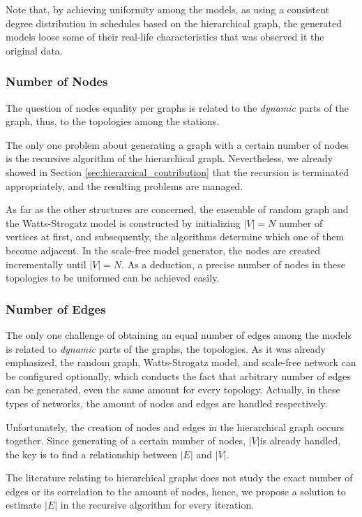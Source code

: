 Note that, by achieving uniformity among the models, as using a consistent degree distribution in schedules based on the hierarchical graph, the generated models loose some of their real-life characteristics that was observed it the original data.

\subsubsection{Number of Nodes}

The question of nodes equality per graphs is related to the \textit{dynamic} parts of the graph, thus, to the topologies among the stations.

The only one problem about generating a graph with a certain number of nodes is the recursive algorithm of the hierarchical graph. Nevertheless, we already showed in Section \ref{sec:hierarcical_contribution} that the recursion is terminated appropriately, and the resulting problems are managed.

As far as the other structures are concerned, the ensemble of random graph and the Watts-Strogatz model is constructed by initializing $|V| = N$ number of vertices at first, and subsequently, the algorithms determine which one of them become adjacent. In the scale-free model generator, the nodes are created incrementally until $|V| = N$. As a deduction, a precise number of nodes in these topologies to be uniformed can be achieved easily.

\subsubsection{Number of Edges}

The only one challenge of obtaining an equal number of edges among the models is related to \textit{dynamic} parts of the graphs, the topologies. As it was already emphasized, the random graph, Watts-Strogatz model, and scale-free network can be configured optionally, which conducts the fact that arbitrary number of edges can be generated, even the same amount for every topology. Actually, in these types of networks, the amount of nodes and edges are handled respectively.

Unfortunately, the creation of nodes and edges in the hierarchical graph occurs together. Since generating of a certain number of nodes, $|V|$is already handled, the key is to find a relationship between $|E|$ and $|V|$.

The literature relating to hierarchical graphs does not study the exact number of edges or its correlation to the amount of nodes, hence, we propose a solution to estimate $|E|$ in the recursive algorithm for every iteration.

